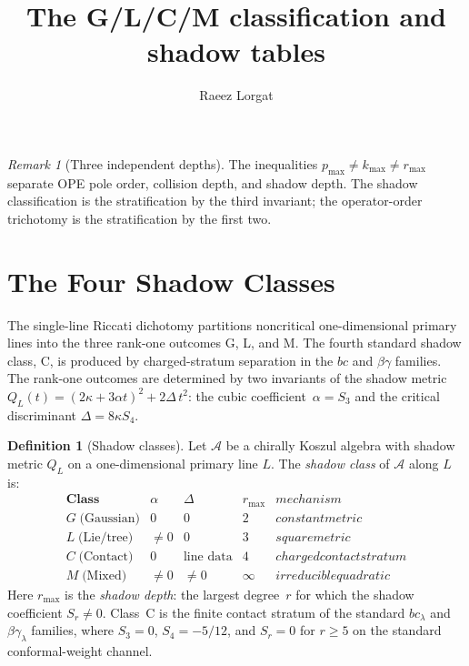 \documentclass[11pt]{article}
\title{The G/L/C/M classification and shadow tables}
\author{Raeez Lorgat}
\date{}
\theoremstyle{plain}
\theoremstyle{definition}
\newtheorem{definition}[theorem]{Definition}
\theoremstyle{remark}
\newtheorem{remark}[theorem]{Remark}
\providecommand{\cA}{\mathcal{A}}
\begin{document}
\maketitle
\fi
\providecommand{\Walg}{\mathcal{W}}


\begin{remark}[Three independent depths]
The inequalities $p_{\max} \neq k_{\max} \neq r_{\max}$ separate
OPE pole order, collision depth, and shadow depth. The shadow
classification is the stratification by the third invariant; the
operator-order trichotomy is the stratification by the first two.
\end{remark}


\section{The Four Shadow Classes}\label{sec:four-classes}

The single-line Riccati dichotomy partitions noncritical
one-dimensional primary lines into the three rank-one outcomes
G, L, and M. The fourth standard shadow class, C, is produced by
charged-stratum separation in the $bc$ and $\beta\gamma$ families.
The rank-one outcomes are determined by two invariants of the shadow metric
$Q_L(t) = (2\kappa + 3\alpha t)^2 + 2\Delta\, t^2$:
the cubic coefficient~$\alpha = S_3$ and the critical
discriminant $\Delta = 8\kappa S_4$.

\begin{definition}[Shadow classes]\label{def:shadow-classes}
Let $\cA$ be a chirally Koszul algebra with shadow metric $Q_L$ on a
one-dimensional primary line $L$. The \emph{shadow class} of $\cA$
along $L$ is:
\[
\renewcommand{\arraystretch}{1.4}
\begin{array}{c|cc|cc}
\textbf{Class} & \alpha & \Delta & r_{\max} & mechanism \\
\hline
G\;\text{(Gaussian)} & 0 & 0 & 2 & constant metric \\
L\;\text{(Lie/tree)} & \neq 0 & 0 & 3 & square metric \\
C\;\text{(Contact)} & 0 & \text{line data} & 4 & charged contact stratum \\
M\;\text{(Mixed)} & \neq 0 & \neq 0 & \infty & irreducible quadratic
\end{array}
\]
Here $r_{\max}$ is the \emph{shadow depth}: the largest degree~$r$
for which the shadow coefficient $S_r \neq 0$.
Class~C is the finite contact stratum of the standard $bc_\lambda$ and
$\beta\gamma_\lambda$ families, where $S_3=0$, $S_4=-5/12$, and
$S_r=0$ for $r\geq5$ on the standard conformal-weight channel.
\end{definition}
\end{document}
